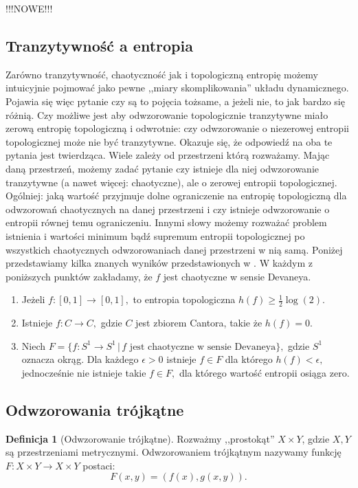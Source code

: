 \documentclass[licencjacka]{pwr_wmat_praca_dyplomowa}
\theoremstyle{plain}
\numberwithin{theorem}{chapter}
\theoremstyle{definition}
\numberwithin{theorem}{chapter}
\newtheorem{definition}[theorem]{Definicja}
\begin{document}
{\color{red} !!!NOWE!!!
\subsection{Tranzytywność a entropia}

Zarówno tranzytywność, chaotyczność jak i topologiczną entropię możemy intuicyjnie pojmować jako pewne ,,miary skomplikowania'' układu dynamicznego. Pojawia się więc pytanie czy są to pojęcia tożsame, a jeżeli nie, to jak bardzo się różnią. Czy możliwe jest aby odwzorowanie topologicznie tranzytywne miało zerową entropię topologiczną i odwrotnie: czy odwzorowanie o niezerowej entropii topologicznej może nie być tranzytywne. Okazuje się, że odpowiedź na oba te pytania jest twierdząca. Wiele zależy od przestrzeni którą rozważamy.
Mając daną przestrzeń, możemy zadać pytanie czy istnieje dla niej odwzorowanie tranzytywne (a nawet więcej: chaotyczne), ale o zerowej entropii topologicznej. Ogólniej: jaką wartość przyjmuje dolne ograniczenie na entropię topologiczną dla odwzorowań chaotycznych na danej przestrzeni i czy istnieje odwzorowanie o entropii równej temu ograniczeniu. Innymi słowy możemy rozważać problem istnienia i wartości minimum bądź supremum entropii topologicznej po wszystkich chaotycznych odwzorowaniach danej przestrzeni w nią samą. Poniżej przedstawiamy kilka znanych wyników przedstawionych w \cite{balibrea2003topological}.
W każdym z poniższych punktów zakładamy, że $f$ jest chaotyczne w sensie Devaneya.
\begin{enumerate}
\item Jeżeli $f: [0,1] \rightarrow [0,1],$ to entropia topologiczna $h(f) \geq \frac{1}{2} \log(2)$.
\item Istnieje $f: C \rightarrow C,$ gdzie $C$ jest zbiorem Cantora, takie że $h(f) = 0.$
\item Niech $F = \{f : S^1 \rightarrow S^1 \, | \, f \textrm{ jest chaotyczne w sensie Devaneya}\},$ gdzie $S^1$ oznacza okrąg. Dla każdego $\epsilon > 0$ istnieje $f \in F$ dla którego $h(f) < \epsilon,$ jednocześnie nie istnieje takie $f \in F,$ dla którego wartość entropii osiąga zero.
\end{enumerate}
}


\subsection{Odwzorowania trójkątne}


\begin{definition}[Odwzorowanie trójkątne]
Rozważmy ,,prostokąt'' $X \times Y$, gdzie $X, Y$ są przestrzeniami metrycznymi. 
Odwzorowaniem trójkątnym nazywamy funkcję $F: X \times Y \rightarrow X \times Y$ postaci:
$$F(x,y) = (f(x), g(x,y)).$$
\end{definition}
\end{document}

